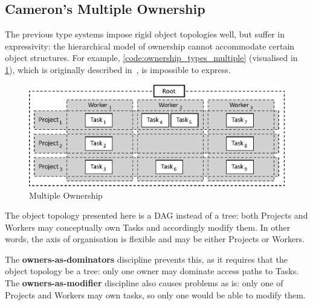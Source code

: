 \documentclass{acm_proc_article-sp}
\begin{document}
%
%


\subsection{Cameron's Multiple Ownership}
\label{subsec:cameron}

The previous type systems impose rigid object topologies well, but suffer in
expressivity: the hierarchical model of ownership cannot accommodate certain
object structures. For example, \cref{code:ownership_types_multiple}
(visualised in \cref{fig:multiple-ownership}), which is originally described
in~\cite{cameron07mojo}, is impossible to express.

\begin{figure}[t]
\centering
\includegraphics{multiple-ownership.eps}
\caption{Multiple Ownership}
\label{fig:multiple-ownership}
\end{figure}

The object topology presented here is a DAG instead of a tree: both Projects and
Workers may conceptually own Tasks and accordingly modify them. In other words,
the axis of organisation is flexible and may be either Projects or Workers.

The \textbf{owners-as-dominators} discipline prevents this, as it requires that
the object topology be a tree: only one owner may dominate access paths to
Tasks. The \textbf{owners-as-modifier} discipline also causes problems as is:
only one of Projects and Workers may own tasks, so only one would be able to
modify them.
\end{document}

